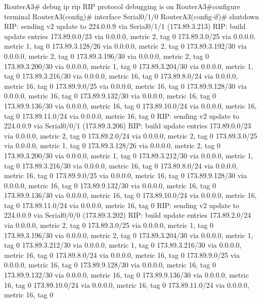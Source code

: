 \begin{listing}[style=consola]
RouterA3# debug ip rip
RIP protocol debugging is on
RouterA3#configure terminal
RouterA3(config)# interface Serial0/1/0
RouterA3(config-if)# shutdown
RIP: sending  v2 update to 224.0.0.9 via Serial0/1/1 (173.89.3.213)
RIP: build update entries
      173.89.0.0/23 via 0.0.0.0, metric 2, tag 0
      173.89.3.0/25 via 0.0.0.0, metric 1, tag 0
      173.89.3.128/26 via 0.0.0.0, metric 2, tag 0
      173.89.3.192/30 via 0.0.0.0, metric 2, tag 0
      173.89.3.196/30 via 0.0.0.0, metric 2, tag 0
      173.89.3.200/30 via 0.0.0.0, metric 1, tag 0
      173.89.3.204/30 via 0.0.0.0, metric 1, tag 0
      173.89.3.216/30 via 0.0.0.0, metric 16, tag 0
      173.89.8.0/24 via 0.0.0.0, metric 16, tag 0
      173.89.9.0/25 via 0.0.0.0, metric 16, tag 0
      173.89.9.128/30 via 0.0.0.0, metric 16, tag 0
      173.89.9.132/30 via 0.0.0.0, metric 16, tag 0
      173.89.9.136/30 via 0.0.0.0, metric 16, tag 0
      173.89.10.0/24 via 0.0.0.0, metric 16, tag 0
      173.89.11.0/24 via 0.0.0.0, metric 16, tag 0
RIP: sending  v2 update to 224.0.0.9 via Serial0/0/1 (173.89.3.206)
RIP: build update entries
      173.89.0.0/23 via 0.0.0.0, metric 2, tag 0
      173.89.2.0/24 via 0.0.0.0, metric 2, tag 0
      173.89.3.0/25 via 0.0.0.0, metric 1, tag 0
      173.89.3.128/26 via 0.0.0.0, metric 2, tag 0
      173.89.3.200/30 via 0.0.0.0, metric 1, tag 0
      173.89.3.212/30 via 0.0.0.0, metric 1, tag 0
      173.89.3.216/30 via 0.0.0.0, metric 16, tag 0
      173.89.8.0/24 via 0.0.0.0, metric 16, tag 0
      173.89.9.0/25 via 0.0.0.0, metric 16, tag 0
      173.89.9.128/30 via 0.0.0.0, metric 16, tag 0
      173.89.9.132/30 via 0.0.0.0, metric 16, tag 0
      173.89.9.136/30 via 0.0.0.0, metric 16, tag 0
      173.89.10.0/24 via 0.0.0.0, metric 16, tag 0
      173.89.11.0/24 via 0.0.0.0, metric 16, tag 0
RIP: sending  v2 update to 224.0.0.9 via Serial0/0/0 (173.89.3.202)
RIP: build update entries
      173.89.2.0/24 via 0.0.0.0, metric 2, tag 0
      173.89.3.0/25 via 0.0.0.0, metric 1, tag 0
      173.89.3.196/30 via 0.0.0.0, metric 2, tag 0
      173.89.3.204/30 via 0.0.0.0, metric 1, tag 0
      173.89.3.212/30 via 0.0.0.0, metric 1, tag 0
      173.89.3.216/30 via 0.0.0.0, metric 16, tag 0
      173.89.8.0/24 via 0.0.0.0, metric 16, tag 0
      173.89.9.0/25 via 0.0.0.0, metric 16, tag 0
      173.89.9.128/30 via 0.0.0.0, metric 16, tag 0
      173.89.9.132/30 via 0.0.0.0, metric 16, tag 0
      173.89.9.136/30 via 0.0.0.0, metric 16, tag 0
      173.89.10.0/24 via 0.0.0.0, metric 16, tag 0
      173.89.11.0/24 via 0.0.0.0, metric 16, tag 0
\end{listing}
